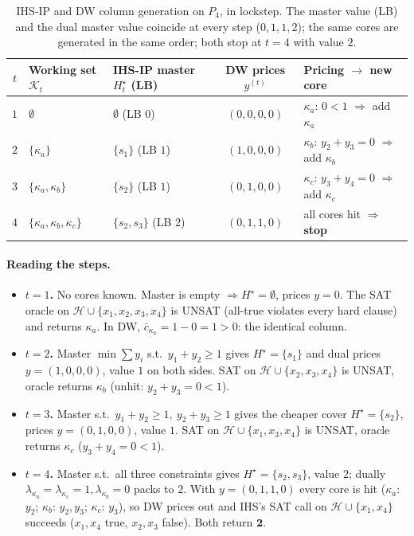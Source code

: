 \documentclass[11pt,a4paper]{article}
\begin{document}
\begin{table}[h]
\centering
\small
\begin{tabular}{c l l c l}
\toprule
$t$ & Working set $\mathcal{K}_t$ & IHS-IP master $H_t^\star$ (LB) & DW prices $y^{(t)}$ & Pricing $\to$ new core \\
\midrule
$1$ & $\emptyset$ & $\emptyset$ \;(LB $0$) & $(0,0,0,0)$ & $\kappa_a$: $0<1$ \;$\Rightarrow$ add $\kappa_a$\\
$2$ & $\{\kappa_a\}$ & $\{s_1\}$ \;(LB $1$) & $(1,0,0,0)$ & $\kappa_b$: $y_2{+}y_3{=}0$ \;$\Rightarrow$ add $\kappa_b$\\
$3$ & $\{\kappa_a,\kappa_b\}$ & $\{s_2\}$ \;(LB $1$) & $(0,1,0,0)$ & $\kappa_c$: $y_3{+}y_4{=}0$ \;$\Rightarrow$ add $\kappa_c$\\
$4$ & $\{\kappa_a,\kappa_b,\kappa_c\}$ & $\{s_2,s_3\}$ \;(LB $2$) & $(0,1,1,0)$ & all cores hit \;$\Rightarrow$ \textbf{stop} \\
\bottomrule
\end{tabular}
\caption{IHS-IP and DW column generation on $P_4$, in lockstep. The master
value (LB) and the dual master value coincide at every step ($0,1,1,2$); the
same cores are generated in the same order; both stop at $t=4$ with value $2$.}
\label{tab:trace}
\end{table}

\paragraph{Reading the steps.}
\begin{itemize}
\item \textbf{$t=1$.} No cores known. Master is empty $\Rightarrow H^\star =
\emptyset$, prices $y=0$. The SAT oracle on $\mathcal{H}\cup\{x_1,x_2,x_3,x_4\}$
is UNSAT (all-true violates every hard clause) and returns $\kappa_a$. In DW,
$\bar c_{\kappa_a} = 1 - 0 = 1 > 0$: the identical column.
\item \textbf{$t=2$.} Master $\min \sum y_i$ s.t.\ $y_1+y_2 \ge 1$ gives
$H^\star=\{s_1\}$ and dual prices $y=(1,0,0,0)$, value $1$ on both sides.
SAT on $\mathcal{H}\cup\{x_2,x_3,x_4\}$ is UNSAT, oracle returns $\kappa_b$
(unhit: $y_2+y_3 = 0 < 1$).
\item \textbf{$t=3$.} Master s.t.\ $y_1+y_2\ge1,\ y_2+y_3\ge1$ gives the cheaper
cover $H^\star=\{s_2\}$, prices $y=(0,1,0,0)$, value $1$. SAT on
$\mathcal{H}\cup\{x_1,x_3,x_4\}$ is UNSAT, oracle returns $\kappa_c$
($y_3+y_4 = 0 < 1$).
\item \textbf{$t=4$.} Master s.t.\ all three constraints gives $H^\star=\{s_2,s_3\}$,
value $2$; dually $\lambda_{\kappa_a}=\lambda_{\kappa_c}=1,\lambda_{\kappa_b}=0$
packs to $2$. With $y=(0,1,1,0)$ every core is hit ($\kappa_a$: $y_2$; $\kappa_b$:
$y_2,y_3$; $\kappa_c$: $y_3$), so DW prices out and IHS's SAT call on
$\mathcal{H}\cup\{x_1,x_4\}$ succeeds ($x_1,x_4$ true, $x_2,x_3$ false). Both
return $\mathbf 2$.
\end{itemize}
\end{document}
